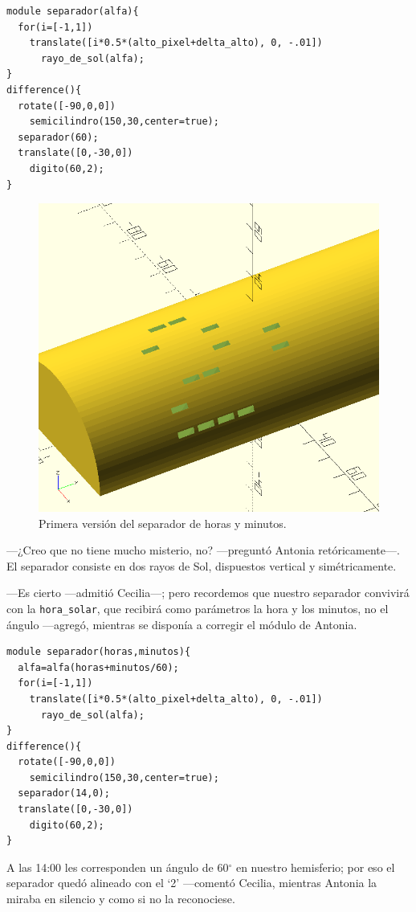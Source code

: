 \begin{lstlisting}
module separador(alfa){
  for(i=[-1,1])
    translate([i*0.5*(alto_pixel+delta_alto), 0, -.01])
      rayo_de_sol(alfa);
}  
difference(){
  rotate([-90,0,0])
    semicilindro(150,30,center=true);  
  separador(60);
  translate([0,-30,0])
    digito(60,2);
}
\end{lstlisting}%
\begin{figure}[ht]
  \centering
\includegraphics[width=.52\textwidth]{imagenes/separador}  
\caption[Separador I]{Primera versión del separador de horas y
  minutos.}
  \label{fig:separador}
\end{figure}


---¿Creo que no tiene mucho misterio, no? ---preguntó An\-to\-nia
re\-tó\-ri\-ca\-men\-te---. El separador consiste en dos rayos de Sol,
dispuestos vertical y simétricamente.

---Es cierto ---admitió Cecilia---; pero recordemos que nuestro
separador convivirá con la \lstinline!hora_solar!, que recibirá como
parámetros la hora y los minutos, no el ángulo ---agregó, mientras se
disponía a corregir el módulo de Antonia.

\begin{lstlisting}
module separador(horas,minutos){
  alfa=alfa(horas+minutos/60);
  for(i=[-1,1])
    translate([i*0.5*(alto_pixel+delta_alto), 0, -.01])
      rayo_de_sol(alfa);
}  
difference(){
  rotate([-90,0,0])
    semicilindro(150,30,center=true);  
  separador(14,0);
  translate([0,-30,0])
    digito(60,2);
}
\end{lstlisting}%


\guillemotright A las 14:00 les corresponden un ángulo de 60$^{\circ}$
en nuestro hemisferio; por eso el separador quedó alineado con el `2'
---co\-men\-tó Cecilia, mientras Antonia la miraba en silencio y como si
no la reconociese.


